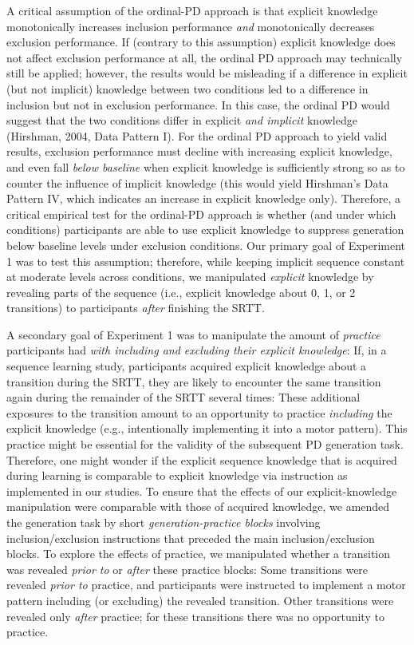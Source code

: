 \documentclass[floatsintext,doc]{apa6}
\theoremstyle{definition}
\theoremstyle{definition}
\theoremstyle{definition}
\theoremstyle{remark}
\begin{document}
A critical assumption of the ordinal-PD approach is that explicit
knowledge monotonically increases inclusion performance \emph{and}
monotonically decreases exclusion performance. If (contrary to this
assumption) explicit knowledge does not affect exclusion performance at
all, the ordinal PD approach may technically still be applied; however,
the results would be misleading if a difference in explicit (but not
implicit) knowledge between two conditions led to a difference in
inclusion but not in exclusion performance. In this case, the ordinal PD
would suggest that the two conditions differ in explicit \emph{and
implicit} knowledge (Hirshman, 2004, Data Pattern I). For the ordinal PD
approach to yield valid results, exclusion performance must decline with
increasing explicit knowledge, and even fall \emph{below baseline} when
explicit knowledge is sufficiently strong so as to counter the influence
of implicit knowledge (this would yield Hirshman's Data Pattern IV,
which indicates an increase in explicit knowledge only). Therefore, a
critical empirical test for the ordinal-PD approach is whether (and
under which conditions) participants are able to use explicit knowledge
to suppress generation below baseline levels under exclusion conditions.
Our primary goal of Experiment 1 was to test this assumption; therefore,
while keeping implicit sequence constant at moderate levels across
conditions, we manipulated \emph{explicit} knowledge by revealing parts
of the sequence (i.e., explicit knowledge about 0, 1, or 2 transitions)
to participants \emph{after} finishing the SRTT.

A secondary goal of Experiment 1 was to manipulate the amount of
\emph{practice} participants had \emph{with including and excluding
their explicit knowledge}: If, in a sequence learning study,
participants acquired explicit knowledge about a transition during the
SRTT, they are likely to encounter the same transition again during the
remainder of the SRTT several times: These additional exposures to the
transition amount to an opportunity to practice \emph{including} the
explicit knowledge (e.g., intentionally implementing it into a motor
pattern). This practice might be essential for the validity of the
subsequent PD generation task. Therefore, one might wonder if the
explicit sequence knowledge that is acquired during learning is
comparable to explicit knowledge via instruction as implemented in our
studies. To ensure that the effects of our explicit-knowledge
manipulation were comparable with those of acquired knowledge, we
amended the generation task by short \emph{generation-practice blocks}
involving inclusion/exclusion instructions that preceded the main
inclusion/exclusion blocks. To explore the effects of practice, we
manipulated whether a transition was revealed \emph{prior to} or
\emph{after} these practice blocks: Some transitions were revealed
\emph{prior to} practice, and participants were instructed to implement
a motor pattern including (or excluding) the revealed transition. Other
transitions were revealed only \emph{after} practice; for these
transitions there was no opportunity to practice.
\end{document}
